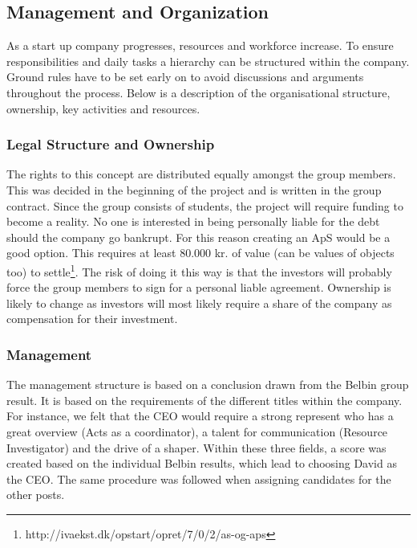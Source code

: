 \subsection{Management and Organization}
As a start up company progresses, resources and workforce increase. To ensure responsibilities and daily tasks a hierarchy can be structured within the company. Ground rules have to be set early on to avoid discussions and arguments throughout the process. Below is a description of the organisational structure, ownership, key activities and resources.

\subsubsection{Legal Structure and Ownership}
The rights to this concept are distributed equally amongst the group members. 
This was decided in the beginning of the project and is written in the group contract.
Since the group consists of students, the project will require funding to become a reality. No one is interested in being personally liable for the debt should the company go bankrupt. 
For this reason creating an ApS would be a good option. 
This requires at least 80.000 kr. of value (can be values of objects too) to settle\footnote{http://ivaekst.dk/opstart/opret/7/0/2/as-og-aps}. The risk of doing it this way is that the investors will probably force the group members to sign for a personal liable agreement. 
Ownership is likely to change as investors will most likely require a share of the company as compensation for their investment.

\subsubsection{Management}
The management structure is based on a conclusion drawn from the Belbin group result. It is based on the requirements of the different titles within the company. For instance, we felt that the CEO would require a strong represent who has a great overview (Acts as a coordinator), a talent for communication (Resource Investigator) and the drive of a shaper. Within these three fields, a score was created based on the individual Belbin results, which lead to choosing David as the CEO. 
The same procedure was followed when assigning candidates for the other posts. 

